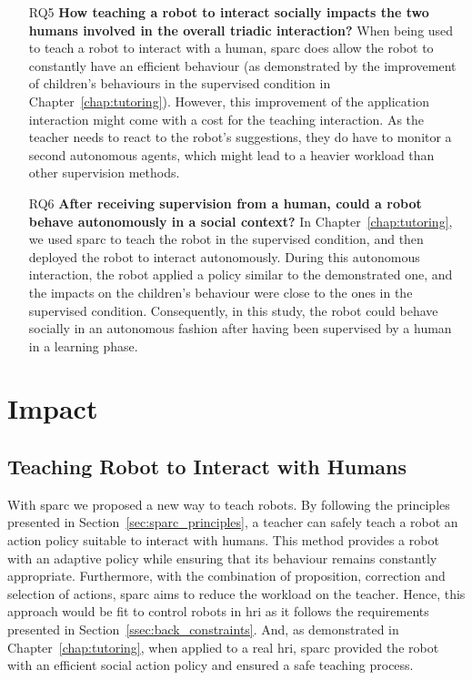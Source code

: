 \begin{itemize}
\item [RQ5] \textbf{How teaching a robot to interact socially impacts the two humans involved in the overall triadic interaction?}
When being used to teach a robot to interact with a human, \gls{sparc} does allow the robot to constantly have an efficient behaviour (as demonstrated by the improvement of children's behaviours in the supervised condition in Chapter~\ref{chap:tutoring}). However, this improvement of the application interaction might come with a cost for the teaching interaction. As the teacher needs to react to the robot's suggestions, they do have to monitor a second autonomous agents, which might lead to a heavier workload than other supervision methods.

\item [RQ6] \textbf{After receiving supervision from a human, could a robot behave autonomously in a social context?}
In Chapter~\ref{chap:tutoring}, we used \gls{sparc} to teach the robot in the supervised condition, and then deployed the robot to interact autonomously. During this autonomous interaction, the robot applied a policy similar to the demonstrated one, and the impacts on the children's behaviour were close to the ones in the supervised condition. Consequently, in this study, the robot could behave socially in an autonomous fashion after having been supervised by a human in a learning phase.

\end{itemize}
\section{Impact} \label{sec:disc_impact}


\subsection{Teaching Robot to Interact with Humans}

With \gls{sparc} we proposed a new way to teach robots. By following the principles presented in Section~\ref{sec:sparc_principles}, a teacher can safely teach a robot an action policy suitable to interact with humans. This method provides a robot with an adaptive policy while ensuring that its behaviour remains constantly appropriate. Furthermore, with the combination of proposition, correction and selection of actions, \gls{sparc} aims to reduce the workload on the teacher. Hence, this approach would be fit to control robots in \gls{hri} as it follows the requirements presented in Section~\ref{ssec:back_constraints}. And, as demonstrated in Chapter~\ref{chap:tutoring}, when applied to a real \gls{hri}, \gls{sparc} provided the robot with an efficient social action policy and ensured a safe teaching process. 


